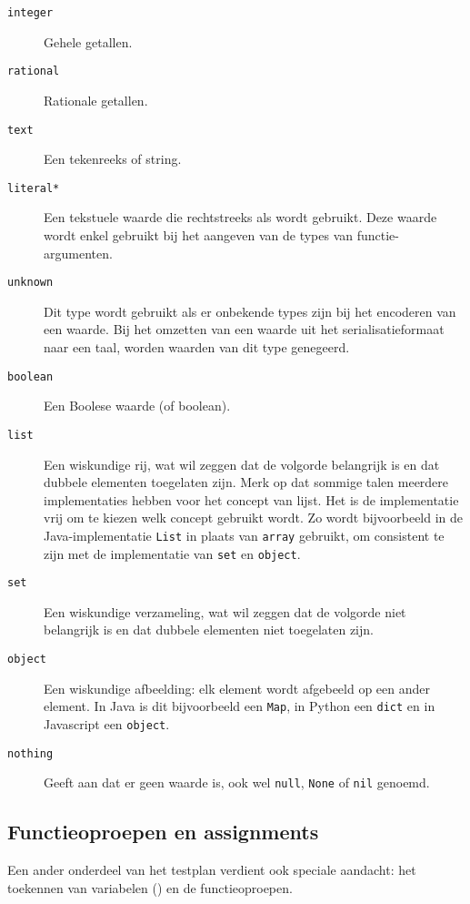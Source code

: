 \begin{description}
    \item[\texttt{integer}] Gehele getallen.
    \item[\texttt{rational}] Rationale getallen.
    \item[\texttt{text}] Een tekenreeks of string.
    \item[\texttt{literal*}] Een tekstuele waarde die rechtstreeks als  wordt gebruikt.
    Deze waarde wordt enkel gebruikt bij het aangeven van de types van functie-argumenten.
    \item[\texttt{unknown}] Dit type wordt gebruikt als er onbekende types zijn bij het encoderen van een waarde.
    Bij het omzetten van een waarde uit het serialisatieformaat naar een taal, worden waarden van dit type genegeerd.
    \item[\texttt{boolean}] Een Boolese waarde (of boolean).
    \item[\texttt{list}] Een wiskundige rij, wat wil zeggen dat de volgorde belangrijk is en dat dubbele elementen toegelaten zijn.
    Merk op dat sommige talen meerdere implementaties hebben voor het concept van lijst.
    Het is de implementatie vrij om te kiezen welk concept gebruikt wordt.
    Zo wordt bijvoorbeeld in de Java-implementatie \texttt{List} in plaats van \texttt{array} gebruikt, om consistent te zijn met de implementatie van \texttt{set} en \texttt{object}.
    \item[\texttt{set}] Een wiskundige verzameling, wat wil zeggen dat de volgorde niet belangrijk is en dat dubbele elementen niet toegelaten zijn.
    \item[\texttt{object}] Een wiskundige afbeelding: elk element wordt afgebeeld op een ander element.
    In Java is dit bijvoorbeeld een \texttt{Map}, in Python een \texttt{dict} en in Javascript een \texttt{object}.
    \item[\texttt{nothing}] Geeft aan dat er geen waarde is, ook wel \texttt{null}, \texttt{None} of \texttt{nil} genoemd.
\end{description}

\subsection{Functieoproepen en assignments}\label{subsec:functieoproepen}

Een ander onderdeel van het testplan verdient ook speciale aandacht: het toekennen van variabelen () en de functieoproepen.

